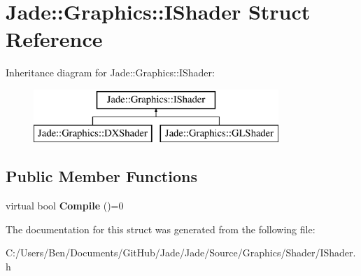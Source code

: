 \hypertarget{struct_jade_1_1_graphics_1_1_i_shader}{}\section{Jade\+:\+:Graphics\+:\+:I\+Shader Struct Reference}
\label{struct_jade_1_1_graphics_1_1_i_shader}
Inheritance diagram for Jade\+:\+:Graphics\+:\+:I\+Shader\+:\begin{figure}[H]
\begin{center}
\leavevmode
\includegraphics[height=2.000000cm]{struct_jade_1_1_graphics_1_1_i_shader}
\end{center}
\end{figure}
\subsection*{Public Member Functions}
\begin{DoxyCompactItemize}
\item 
\hypertarget{struct_jade_1_1_graphics_1_1_i_shader_a9b931784291251bb1049e528852edcd8}{}virtual bool {\bfseries Compile} ()=0\label{struct_jade_1_1_graphics_1_1_i_shader_a9b931784291251bb1049e528852edcd8}

\end{DoxyCompactItemize}


The documentation for this struct was generated from the following file\+:\begin{DoxyCompactItemize}
\item 
C\+:/\+Users/\+Ben/\+Documents/\+Git\+Hub/\+Jade/\+Jade/\+Source/\+Graphics/\+Shader/I\+Shader.\+h\end{DoxyCompactItemize}
